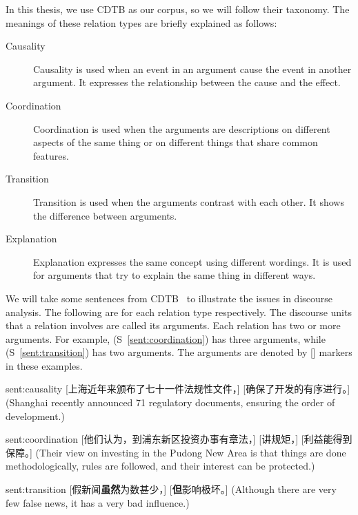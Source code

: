 In this thesis, we use CDTB as our corpus, so we will follow their taxonomy.
The meanings of these relation types are briefly explained as follows:

\begin{description}
\item[Causality] Causality is used when an event in an argument cause the event
    in another argument. It expresses the relationship between the cause
    and the effect.
\item[Coordination] Coordination is used when the arguments are
    descriptions on different aspects of the same thing or
    on different things that share common features.
\item[Transition] Transition is used when the arguments contrast with each other.
    It shows the difference between arguments.
\item[Explanation] Explanation expresses the same concept using different wordings.
    It is used for arguments that try to explain the same thing in different
    ways.
\end{description}


We will take some sentences from CDTB~\citep{li2014building} to illustrate the issues
in discourse analysis. The following are for each relation type respectively.
The discourse units that a relation involves are called its arguments.
Each relation has two or more arguments. For example, (S~\ref{sent:coordination}) has
three arguments, while (S~\ref{sent:transition}) has two arguments. The arguments are
denoted by [] markers in these examples.

\begin{sent}{sent:causality}{}
    [上海近年来颁布了七十一件法规性文件，] [确保了开发的有序进行。]
    (Shanghai recently announced 71 regulatory documents, ensuring
    the order of development.)
\end{sent}

\begin{sent}{sent:coordination}{}
    [他们认为，到浦东新区投资办事有章法，] [讲规矩，] [利益能得到保障。]
    (Their view on investing in the Pudong New Area is that
    things are done methodologically,
    rules are followed, and their interest can be protected.)
\end{sent}

\begin{sent}{sent:transition}{}
    [假新闻\textbf{虽然}为数甚少，] [\textbf{但}影响极坏。]
    (Although there are very few false news, it has a very bad influence.)
\end{sent}

